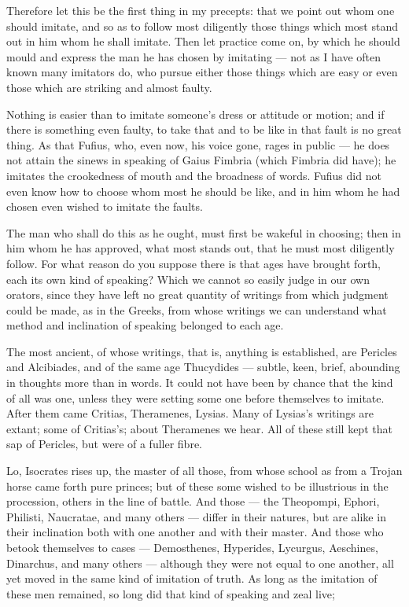  Therefore let this be the first thing in my precepts: that we point out whom one should imitate, and so as to follow most diligently those things which most stand out in him whom he shall imitate. Then let practice come on, by which he should mould and express the man he has chosen by imitating — not as I have often known many imitators do, who pursue either those things which are easy or even those which are striking and almost faulty.

 Nothing is easier than to imitate someone's dress or attitude or motion; and if there is something even faulty, to take that and to be like in that fault is no great thing. As that Fufius, who, even now, his voice gone, rages in public — he does not attain the sinews in speaking of Gaius Fimbria (which Fimbria did have); he imitates the crookedness of mouth and the broadness of words. Fufius did not even know how to choose whom most he should be like, and in him whom he had chosen even wished to imitate the faults.

 The man who shall do this as he ought, must first be wakeful in choosing; then in him whom he has approved, what most stands out, that he must most diligently follow. For what reason do you suppose there is that ages have brought forth, each its own kind of speaking? Which we cannot so easily judge in our own orators, since they have left no great quantity of writings from which judgment could be made, as in the Greeks, from whose writings we can understand what method and inclination of speaking belonged to each age.

 The most ancient, of whose writings, that is, anything is established, are Pericles and Alcibiades, and of the same age Thucydides — subtle, keen, brief, abounding in thoughts more than in words. It could not have been by chance that the kind of all was one, unless they were setting some one before themselves to imitate. After them came Critias, Theramenes, Lysias. Many of Lysias's writings are extant; some of Critias's; about Theramenes we hear. All of these still kept that sap of Pericles, but were of a fuller fibre.

 Lo, Isocrates rises up, the master of all those, from whose school as from a Trojan horse came forth pure princes; but of these some wished to be illustrious in the procession, others in the line of battle. And those — the Theopompi, Ephori, Philisti, Naucratae, and many others — differ in their natures, but are alike in their inclination both with one another and with their master. And those who betook themselves to cases — Demosthenes, Hyperides, Lycurgus, Aeschines, Dinarchus, and many others — although they were not equal to one another, all yet moved in the same kind of imitation of truth. As long as the imitation of these men remained, so long did that kind of speaking and zeal live;

